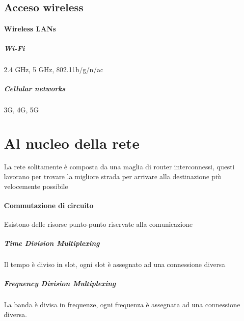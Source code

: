         \subsection{Acceso wireless}
            \paragraph{Wireless \Acrshort*{LAN}s} 
                \subparagraph{\Acrshort*{Wi-Fi}} 2.4 GHz, 5 GHz, 802.11b/g/n/ac
                \subparagraph{Cellular networks} 3G, 4G, 5G
    \section{Al nucleo della rete}
        La rete solitamente è composta da una maglia di router interconnessi, questi lavorano per trovare la migliore strada per arrivare alla destinazione più velocemente possibile
        \paragraph{Commutazione di circuito} Esistono delle risorse punto-punto riservate alla comunicazione
            \subparagraph{Time Division Multiplexing} Il tempo è diviso in slot, ogni slot è assegnato ad una connessione diversa
            \subparagraph{Frequency Division Multiplexing} La banda è divisa in frequenze, ogni frequenza è assegnata ad una connessione diversa.

